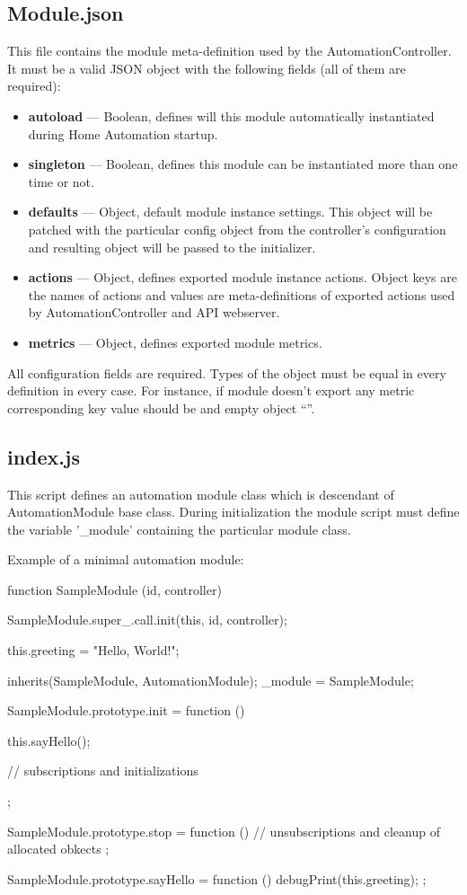 \subsection{Module.json}

This file contains the module meta-definition used by the AutomationController. It must 
be a valid JSON object with the following fields (all of them are required):
\begin{itemize}
\item \textbf{autoload} — Boolean, defines will this module automatically instantiated during Home Automation startup.
\item \textbf{singleton} — Boolean, defines this module can be instantiated more than one time or not.
\item \textbf{defaults} — Object, default module instance settings. This object will be patched with the particular 
config object from the controller's configuration and resulting object will be passed to the initializer.
\item \textbf{actions} — Object, defines exported module instance actions. Object keys 
are the names of actions and  values are meta-definitions of exported actions used by 
AutomationController and API webserver.
\item \textbf{metrics} — Object, defines exported module metrics.
\end{itemize}
All configuration fields are required. Types of the object must be equal in every 
definition in every case. For instance, if module doesn't export any metric corresponding 
key value should be and empty object “{}”.

\subsection{index.js}
 
This script defines an automation module class which is descendant of AutomationModule base class.
During initialization the module script must define the variable '\_module' containing the particular module class.


Example of a minimal automation module:

\begin{listingverbatim}

function SampleModule (id, controller) {
    SampleModule.super_.call.init(this, id, controller);
    
    this.greeting = "Hello, World!";
}

inherits(SampleModule, AutomationModule);
_module = SampleModule;

SampleModule.prototype.init = function () {
    this.sayHello();
    
    // subscriptions and initializations
};

SampleModule.prototype.stop = function () {
    // unsubscriptions and cleanup of allocated obkects
};

SampleModule.prototype.sayHello = function () {
    debugPrint(this.greeting);
};

\end{listingverbatim}
 
